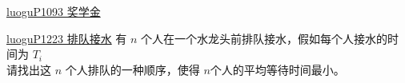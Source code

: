 \documentclass[aspectratio=169,xcolor=dvipsnames]{beamer}
\begin{document}




\begin{frame}{\href{https://www.luogu.com.cn/problem/P1093}{luoguP1093 奖学金}}

\end{frame}

\begin{frame}{\href{https://www.luogu.com.cn/problem/P1223}{luoguP1223 排队接水}}
    有 $n$ 个人在一个水龙头前排队接水，假如每个人接水的时间为 $T_i$\\
    请找出这 $n$ 个人排队的一种顺序，使得 $n$个人的平均等待时间最小。
\end{frame}
\end{document}
